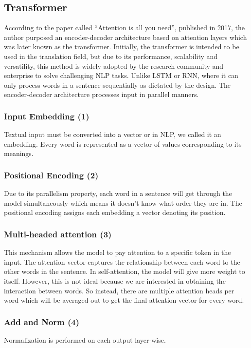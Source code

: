 \documentclass[12pt,oneside,openright,a4paper]{cpe-english-project}
\begin{document}
\subsection{Transformer}
According to the paper called “Attention is all you need”, published in 2017, the author purposed an encoder-decoder architecture based on attention layers which was later known as the transformer\cite{m}\cite{n}. Initially, the transformer is intended to be used in the translation field, but due to its performance, scalability and versatility, this method is widely adopted by the research community and enterprise to solve challenging NLP tasks. Unlike LSTM or RNN, where it can only process words in a sentence sequentially as dictated by the design. The encoder-decoder architecture processes input in parallel manners. 

\subsubsection{Input Embedding (1)}
Textual input must be converted into a vector or in NLP, we called it an embedding. Every word is represented as a vector of values corresponding to its meanings. 

\subsubsection{Positional Encoding (2)}
Due to its parallelism property, each word in a sentence will get through the model simultaneously which means it doesn't know what order they are in. The positional encoding assigns each embedding a vector denoting its position.

\subsubsection{Multi-headed attention (3)}
This mechanism allows the model to pay attention to a specific token in the input. The attention vector captures the relationship between each word to the other words in the sentence. In self-attention, the model will give more weight to itself. However, this is not ideal because we are interested in obtaining the interaction between words. So instead, there are multiple attention heads per word which will be averaged out to get the final attention vector for every word.

\subsubsection{Add and Norm (4)}
Normalization is performed on each output layer-wise.
\end{document}
